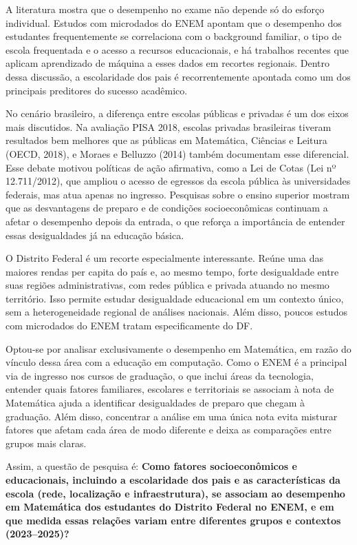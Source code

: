 \documentclass[twocolumn,10pt,a4paper]{article}
\begin{document}
A literatura mostra que o desempenho no exame não depende só do esforço individual. Estudos com microdados do ENEM apontam que o desempenho dos estudantes frequentemente se correlaciona com o background familiar, o tipo de escola frequentada e o acesso a recursos educacionais, e há trabalhos recentes que aplicam aprendizado de máquina a esses dados em recortes regionais. Dentro dessa discussão, a escolaridade dos pais é recorrentemente apontada como um dos principais preditores do sucesso acadêmico.

No cenário brasileiro, a diferença entre escolas públicas e privadas é um dos eixos mais discutidos. Na avaliação PISA 2018, escolas privadas brasileiras tiveram resultados bem melhores que as públicas em Matemática, Ciências e Leitura (OECD, 2018), e Moraes e Belluzzo (2014) também documentam esse diferencial. Esse debate motivou políticas de ação afirmativa, como a Lei de Cotas (Lei nº 12.711/2012), que ampliou o acesso de egressos da escola pública às universidades federais, mas atua apenas no ingresso. Pesquisas sobre o ensino superior mostram que as desvantagens de preparo e de condições socioeconômicas continuam a afetar o desempenho depois da entrada, o que reforça a importância de entender essas desigualdades já na educação básica.

O Distrito Federal é um recorte especialmente interessante. Reúne uma das maiores rendas per capita do país e, ao mesmo tempo, forte desigualdade entre suas regiões administrativas, com redes pública e privada atuando no mesmo território. Isso permite estudar desigualdade educacional em um contexto único, sem a heterogeneidade regional de análises nacionais. Além disso, poucos estudos com microdados do ENEM tratam especificamente do DF.

Optou-se por analisar exclusivamente o desempenho em Matemática, em razão do vínculo dessa área com a educação em computação. Como o ENEM é a principal via de ingresso nos cursos de graduação, o que inclui áreas da tecnologia, entender quais fatores familiares, escolares e territoriais se associam à nota de Matemática ajuda a identificar desigualdades de preparo que chegam à graduação. Além disso, concentrar a análise em uma única nota evita misturar fatores que afetam cada área de modo diferente e deixa as comparações entre grupos mais claras.

Assim, a questão de pesquisa é: \textbf{Como fatores socioeconômicos e educacionais, incluindo a escolaridade dos pais e as características da escola (rede, localização e infraestrutura), se associam ao desempenho em Matemática dos estudantes do Distrito Federal no ENEM, e em que medida essas relações variam entre diferentes grupos e contextos (2023--2025)?}
\end{document}
